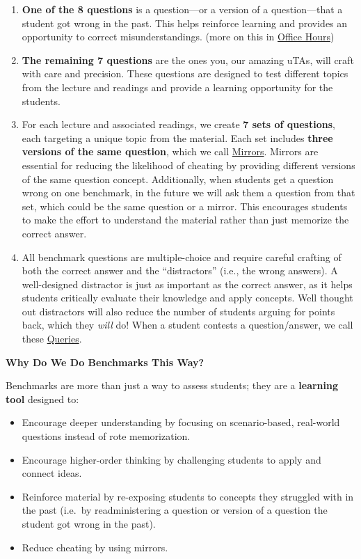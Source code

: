\documentclass[
]{article}
\providecommand{\tightlist}{%
  \setlength{\itemsep}{0pt}\setlength{\parskip}{0pt}}
\begin{document}
\begin{enumerate}
\def\labelenumi{\arabic{enumi}.}
\tightlist
\item
  \textbf{One of the 8 questions} is a question---or a version of a question---that a student got wrong in the past. This helps reinforce learning and provides an opportunity to correct misunderstandings. (more on this in \protect\hyperlink{office-hours}{Office Hours})
\item
  \textbf{The remaining 7 questions} are the ones you, our amazing uTAs, will craft with care and precision. These questions are designed to test different topics from the lecture and readings and provide a learning opportunity for the students.
\item
  For each lecture and associated readings, we create \textbf{7 sets of questions}, each targeting a unique topic from the material. Each set includes \textbf{three versions of the same question}, which we call \protect\hyperlink{mirrors-how-and-why}{Mirrors}. Mirrors are essential for reducing the likelihood of cheating by providing different versions of the same question concept. Additionally, when students get a question wrong on one benchmark, in the future we will ask them a question from that set, which could be the same question or a mirror. This encourages students to make the effort to understand the material rather than just memorize the correct answer.
\item
  All benchmark questions are multiple-choice and require careful crafting of both the correct answer and the ``distractors'' (i.e., the wrong answers). A well-designed distractor is just as important as the correct answer, as it helps students critically evaluate their knowledge and apply concepts. Well thought out distractors will also reduce the number of students arguing for points back, which they \emph{will} do! When a student contests a question/answer, we call these \protect\hyperlink{benchmark-queries}{Queries}.
\end{enumerate}

\textbf{Why Do We Do Benchmarks This Way?}

Benchmarks are more than just a way to assess students; they are a \textbf{learning tool} designed to:

\begin{itemize}
\tightlist
\item
  Encourage deeper understanding by focusing on scenario-based, real-world questions instead of rote memorization.
\item
  Encourage higher-order thinking by challenging students to apply and connect ideas.
\item
  Reinforce material by re-exposing students to concepts they struggled with in the past (i.e.~by readministering a question or version of a question the student got wrong in the past).
\item
  Reduce cheating by using mirrors.
\end{itemize}
\end{document}
